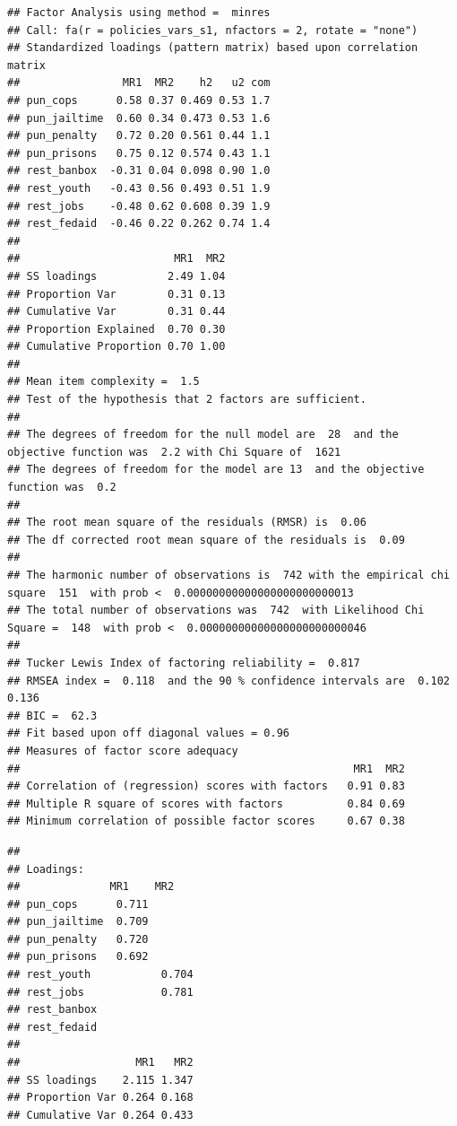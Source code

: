 \documentclass[
]{book}
\begin{document}
\begin{verbatim}
## Factor Analysis using method =  minres
## Call: fa(r = policies_vars_s1, nfactors = 2, rotate = "none")
## Standardized loadings (pattern matrix) based upon correlation matrix
##                MR1  MR2    h2   u2 com
## pun_cops      0.58 0.37 0.469 0.53 1.7
## pun_jailtime  0.60 0.34 0.473 0.53 1.6
## pun_penalty   0.72 0.20 0.561 0.44 1.1
## pun_prisons   0.75 0.12 0.574 0.43 1.1
## rest_banbox  -0.31 0.04 0.098 0.90 1.0
## rest_youth   -0.43 0.56 0.493 0.51 1.9
## rest_jobs    -0.48 0.62 0.608 0.39 1.9
## rest_fedaid  -0.46 0.22 0.262 0.74 1.4
## 
##                        MR1  MR2
## SS loadings           2.49 1.04
## Proportion Var        0.31 0.13
## Cumulative Var        0.31 0.44
## Proportion Explained  0.70 0.30
## Cumulative Proportion 0.70 1.00
## 
## Mean item complexity =  1.5
## Test of the hypothesis that 2 factors are sufficient.
## 
## The degrees of freedom for the null model are  28  and the objective function was  2.2 with Chi Square of  1621
## The degrees of freedom for the model are 13  and the objective function was  0.2 
## 
## The root mean square of the residuals (RMSR) is  0.06 
## The df corrected root mean square of the residuals is  0.09 
## 
## The harmonic number of observations is  742 with the empirical chi square  151  with prob <  0.00000000000000000000000013 
## The total number of observations was  742  with Likelihood Chi Square =  148  with prob <  0.00000000000000000000000046 
## 
## Tucker Lewis Index of factoring reliability =  0.817
## RMSEA index =  0.118  and the 90 % confidence intervals are  0.102 0.136
## BIC =  62.3
## Fit based upon off diagonal values = 0.96
## Measures of factor score adequacy             
##                                                    MR1  MR2
## Correlation of (regression) scores with factors   0.91 0.83
## Multiple R square of scores with factors          0.84 0.69
## Minimum correlation of possible factor scores     0.67 0.38
\end{verbatim}

\begin{verbatim}
## 
## Loadings:
##              MR1    MR2   
## pun_cops      0.711       
## pun_jailtime  0.709       
## pun_penalty   0.720       
## pun_prisons   0.692       
## rest_youth           0.704
## rest_jobs            0.781
## rest_banbox               
## rest_fedaid               
## 
##                  MR1   MR2
## SS loadings    2.115 1.347
## Proportion Var 0.264 0.168
## Cumulative Var 0.264 0.433
\end{verbatim}
\end{document}
